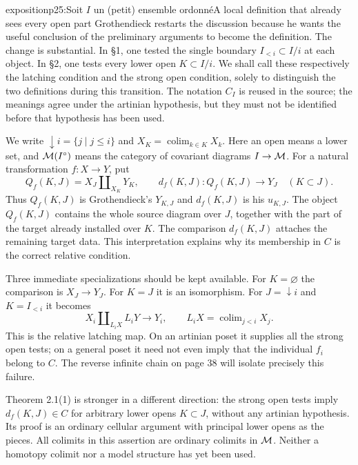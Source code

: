 \begin{dcomment}{exposition}{p25:Soit $I$ un (petit) ensemble ordonné}{A local definition that already sees every open part}
Grothendieck restarts the discussion because he wants the useful conclusion of the preliminary arguments to become the definition. The change is substantial. In \S1, one tested the single boundary $I_{<i}\subset I/i$ at each object. In \S2, one tests every lower open $K\subset I/i$. We shall call these respectively the latching condition and the strong open condition, solely to distinguish the two definitions during this transition. The notation $C_I$ is reused in the source; the meanings agree under the artinian hypothesis, but they must not be identified before that hypothesis has been used.

We write $\downarrow i=\{j\mid j\leq i\}$ and $X_K=\operatorname{colim}_{k\in K}X_k$. Here an open means a lower set, and $\mathcal{M}(I^\circ)$ means the category of covariant diagrams $I\to\mathcal{M}$. For a natural transformation $f:X\to Y$, put
\[
 Q_f(K,J)=X_J\amalg_{X_K}Y_K,
 \qquad d_f(K,J):Q_f(K,J)\longrightarrow Y_J
 \quad(K\subset J).
\]
Thus $Q_f(K,J)$ is Grothendieck's $Y_{K,J}$ and $d_f(K,J)$ is his $u_{K,J}$. The object $Q_f(K,J)$ contains the whole source diagram over $J$, together with the part of the target already installed over $K$. The comparison $d_f(K,J)$ attaches the remaining target data. This interpretation explains why its membership in $C$ is the correct relative condition.

Three immediate specializations should be kept available. For $K=\varnothing$ the comparison is $X_J\to Y_J$. For $K=J$ it is an isomorphism. For $J=\downarrow i$ and $K=I_{<i}$ it becomes
\[
 X_i\amalg_{L_iX}L_iY\longrightarrow Y_i,
 \qquad L_iX=\operatorname{colim}_{j<i}X_j.
\]
This is the relative latching map. On an artinian poset it supplies all the strong open tests; on a general poset it need not even imply that the individual $f_i$ belong to $C$. The reverse infinite chain on page 38 will isolate precisely this failure.

Theorem 2.1(1) is stronger in a different direction: the strong open tests imply $d_f(K,J)\in C$ for arbitrary lower opens $K\subset J$, without any artinian hypothesis. Its proof is an ordinary cellular argument with principal lower opens as the pieces. All colimits in this assertion are ordinary colimits in $\mathcal{M}$. Neither a homotopy colimit nor a model structure has yet been used.
\end{dcomment}


